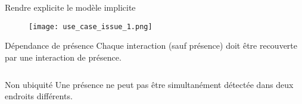 \begin{frame}{Rendre explicite le modèle implicite}
  \addtocounter{framenumber}{-1}
  \begin{minipage}{0.3\linewidth}
      \begin{figure}
        \texttt{[image: use\_case\_issue\_1.png]}
      \end{figure}
    \end{minipage}
  \hfill
  \begin{minipage}{0.65\linewidth}
    \begin{coloredbox}[black]{Dépendance de présence}
      \footnotesize
      Chaque interaction (sauf présence) doit être recouverte par une interaction de présence.
      \small
      \begin{displaymath}
        \begin{array}{c}
        ~\\
        ~
        \end{array}
      \end{displaymath}
    \end{coloredbox}
    \begin{coloredbox}[black]{Non ubiquité}
      \footnotesize
      Une présence ne peut pas être simultanément détectée dans deux endroits différents.
      \small
      \begin{displaymath}
        \begin{array}{c}
         ~\\ 
         ~
        \end{array}
      \end{displaymath}
    \end{coloredbox}
  \end{minipage}
\end{frame}


